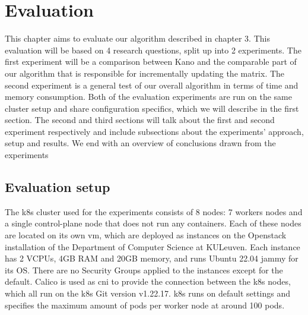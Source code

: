 \chapter{Evaluation}                                 \label{ch:evaluation}
This chapter aims to evaluate our algorithm described in chapter 3. This evaluation will be based on 4 research questions, split up into 2 experiments. The first experiment will be a comparison between Kano and the comparable part of our algorithm that is responsible for incrementally updating the matrix. The second experiment is a general test of our overall algorithm in terms of time and memory consumption. Both of the evaluation experiments are run on the same cluster setup and share configuration specifics, which we will describe in the first section. The second and third sections will talk about the first and second experiment respectively and include subsections about the experiments' approach, setup and results. We end with an overview of  conclusions drawn from the experiments
\\[10pt]

\section{Evaluation setup} \label{sec:evalsetup}


The \acrshort{k8s} cluster used for the experiments consists of 8 nodes: 7 workers nodes and a single control-plane node that does not run any containers. Each of these nodes are located on its own \acrshort{vm}, which are deployed as instances on the Openstack installation of the Department of Computer Science at KULeuven. Each instance has 2 VCPUs, 4GB RAM and 20GB memory, and runs Ubuntu 22.04 jammy for its OS. There are no Security Groups applied to the instances except for the default. Calico is used as \acrshort{cni} to provide the connection between the \acrshort{k8s} nodes, which all run on the \acrshort{k8s} Git version v1.22.17. \acrshort{k8s} runs on default settings and specifies the maximum amount of pods per worker node at around 100 pods.
\\[10pt]

